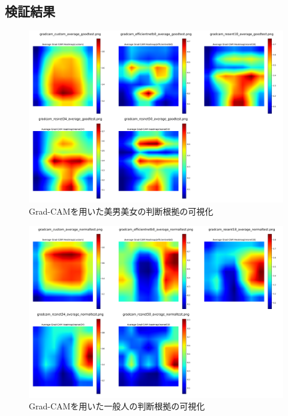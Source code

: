 \documentclass[a4paper,11pt,titlepage]{jsarticle}
\begin{document}
\subsection{検証結果}
\begin{figure}[H]
    \centering
    \includegraphics[width=1.1\textwidth]{combined_images_good.png}
    \caption{Grad-CAMを用いた美男美女の判断根拠の可視化}
    \label{fig:gradcam_good}
\end{figure}
\begin{figure}[H]
    \centering
    \includegraphics[width=1.1\textwidth]{combined_images_normal.png}
    \caption{Grad-CAMを用いた一般人の判断根拠の可視化}
    \label{fig:gradcam_normal}
\end{figure}
\end{document}
